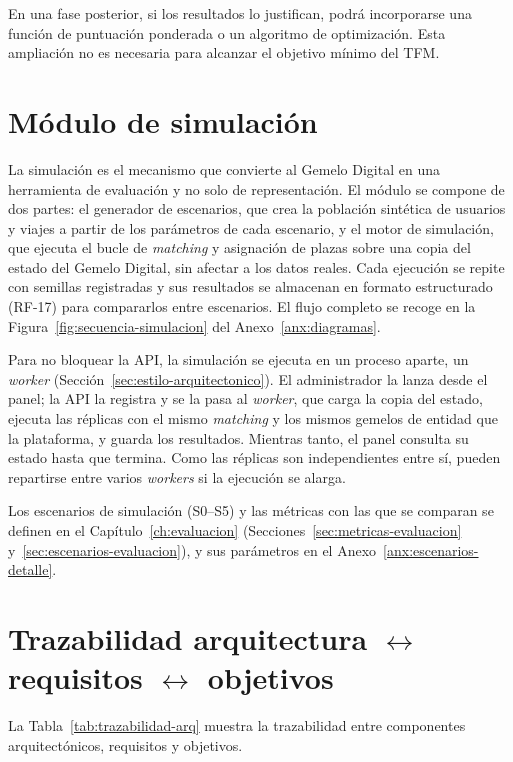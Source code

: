 En una fase posterior, si los resultados lo justifican, podrá incorporarse una función de puntuación ponderada o un algoritmo de optimización. Esta ampliación no es necesaria para alcanzar el objetivo mínimo del TFM.

\section{Módulo de simulación}

La simulación es el mecanismo que convierte al Gemelo Digital en una herramienta de evaluación y no solo de representación. El módulo se compone de dos partes: el generador de escenarios, que crea la población sintética de usuarios y viajes a partir de los parámetros de cada escenario, y el motor de simulación, que ejecuta el bucle de \textit{matching} y asignación de plazas sobre una copia del estado del Gemelo Digital, sin afectar a los datos reales. Cada ejecución se repite con semillas registradas y sus resultados se almacenan en formato estructurado (RF-17) para compararlos entre escenarios. El flujo completo se recoge en la Figura~\ref{fig:secuencia-simulacion} del Anexo~\ref{anx:diagramas}.

Para no bloquear la API, la simulación se ejecuta en un proceso aparte, un \textit{worker} (Sección~\ref{sec:estilo-arquitectonico}). El administrador la lanza desde el panel; la API la registra y se la pasa al \textit{worker}, que carga la copia del estado, ejecuta las réplicas con el mismo \textit{matching} y los mismos gemelos de entidad que la plataforma, y guarda los resultados. Mientras tanto, el panel consulta su estado hasta que termina. Como las réplicas son independientes entre sí, pueden repartirse entre varios \textit{workers} si la ejecución se alarga.

Los escenarios de simulación (S0--S5) y las métricas con las que se comparan se definen en el Capítulo~\ref{ch:evaluacion} (Secciones~\ref{sec:metricas-evaluacion} y~\ref{sec:escenarios-evaluacion}), y sus parámetros en el Anexo~\ref{anx:escenarios-detalle}.

\section{Trazabilidad arquitectura \texorpdfstring{$\leftrightarrow$}{<->} requisitos \texorpdfstring{$\leftrightarrow$}{<->} objetivos}

La Tabla~\ref{tab:trazabilidad-arq} muestra la trazabilidad entre componentes arquitectónicos, requisitos y objetivos.

